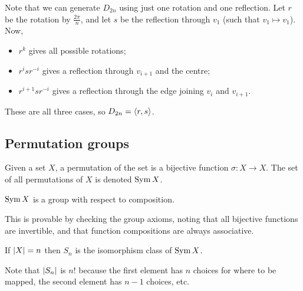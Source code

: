 Note that we can generate \(D_{2n}\) using just one rotation and one reflection.
Let \(r\) be the rotation by \(\frac{2\pi}{n}\), and let \(s\) be the reflection through \(v_1\) (such that \(v_1 \mapsto v_1\)).
Now,
\begin{itemize}
	\item \(r^k\) gives all possible rotations;
	\item \(r^i s r^{-i}\) gives a reflection through \(v_{i+1}\) and the centre;
	\item \(r^{i+1} s r^{-i}\) gives a reflection through the edge joining \(v_{i}\) and \(v_{i+1}\).
\end{itemize}
These are all three cases, so \(D_{2n} = \langle{} r, s \rangle\).

\subsection{Permutation groups}
\begin{definition}
	Given a set \(X\), a permutation of the set is a bijective function \(\sigma: X \to X\).
	The set of all permutations of \(X\) is denoted \(\operatorname{Sym} X\).
\end{definition}
\begin{theorem}
	\(\operatorname{Sym} X\) is a group with respect to composition.
\end{theorem}
This is provable by checking the group axioms, noting that all bijective functions are invertible, and that function compositions are always associative.
\begin{definition}
	If \(\abs{X} = n\) then \(S_n\) is the isomorphism class of \(\operatorname{Sym} X\).
\end{definition}
Note that \(\abs{S_n}\) is \(n!
\) because the first element has \(n\) choices for where to be mapped, the second element has \(n-1\) choices, etc.
